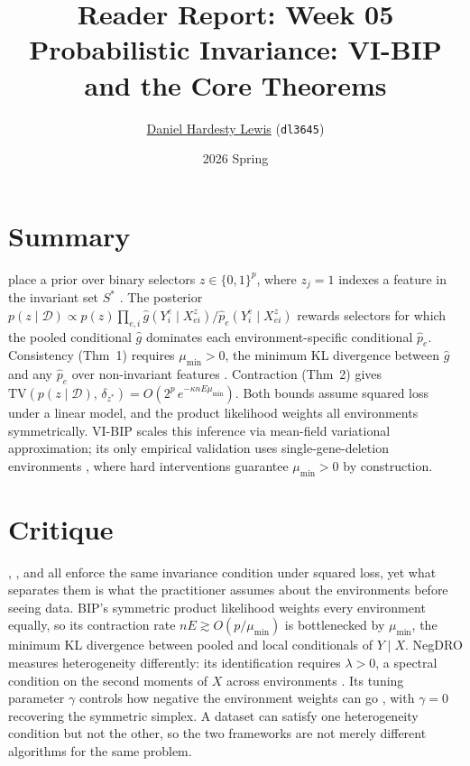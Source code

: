 \documentclass[10.5pt]{article}
\title{\vspace{-2.5em}\textbf{Reader Report: Week 05} \\ \vspace{0.1em} \large Probabilistic Invariance: VI-BIP and the Core Theorems}
\author{\href{https://github.com/dhardestylewis}{Daniel Hardesty Lewis} (\texttt{dl3645})}
\date{\vspace{-0.5em}2026 Spring}
\begin{document}
\maketitle
\thispagestyle{fancy}
\vspace{-1.4em}

\section*{Summary}

\citet{wu2025bayesian} place a prior over binary selectors $z\in\{0,1\}^p$, where $z_j=1$ indexes a feature in the invariant set $S^*$ \citep{peters2016icp}.
The posterior $p(z\mid\mathcal{D})\propto p(z)\prod_{e,i}\hat{g}(Y^e_i\mid X^z_{ei})/\hat{p}_e(Y^e_i\mid X^z_{ei})$ rewards selectors for which the pooled conditional $\hat{g}$ dominates each environment-specific conditional $\hat{p}_e$.
Consistency (Thm~1) requires $\mu_{\min}>0$, the minimum KL divergence between $\hat{g}$ and any $\hat{p}_e$ over non-invariant features \citep[Def.~1]{wu2025bayesian}. Contraction (Thm~2) gives $\mathrm{TV}(p(z\mid\mathcal{D}),\,\delta_{z^*}) = O(2^p\,e^{-\kappa nE\mu_{\min}})$.
Both bounds assume squared loss under a linear model, and the product likelihood weights all environments symmetrically.
VI-BIP \citep[Sec.~4]{wu2025bayesian} scales this inference via mean-field variational approximation; its only empirical validation uses single-gene-deletion environments \citep[Sec.~5]{wu2025bayesian}, where hard interventions guarantee $\mu_{\min}>0$ by construction.

\section*{Critique}

\citet{peters2016icp}, \citet{wang2026negdro}, and \citet{wu2025bayesian} all enforce the same invariance condition under squared loss, yet what separates them is what the practitioner assumes about the environments before seeing data. BIP's symmetric product likelihood weights every environment equally, so its contraction rate $nE \gtrsim O(p/\mu_{\min})$ is bottlenecked by $\mu_{\min}$, the minimum KL divergence between pooled and local conditionals of $Y\mid X$. NegDRO measures heterogeneity differently: its identification requires $\lambda>0$, a spectral condition on the second moments of $X$ across environments \citep[Cond.~1b]{wang2026negdro}. Its tuning parameter $\gamma$ controls how negative the environment weights can go \citep[Eq.~9]{wang2026negdro}, with $\gamma=0$ recovering the symmetric simplex. A dataset can satisfy one heterogeneity condition but not the other, so the two frameworks are not merely different algorithms for the same problem.
\end{document}
